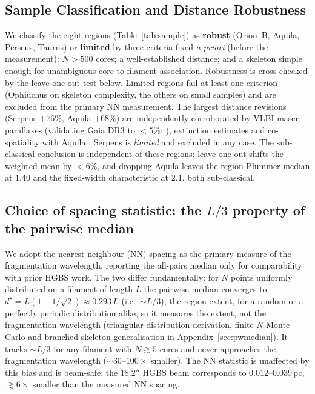 \documentclass[usenatbib,twoside,twocolumn]{mnras}
\begin{document}
\subsection{Sample Classification and Distance Robustness}
\label{sec:distance_uncertainties}

We classify the eight regions (Table~\ref{tab:sample}) as \textbf{robust} (Orion~B, Aquila, Perseus, Taurus) or \textbf{limited} by three criteria fixed \emph{a priori} (before the measurement): $N>500$ cores; a well-established distance; and a skeleton simple enough for unambiguous core-to-filament association. Robustness is cross-checked by the leave-one-out test below. Limited regions fail at least one criterion (Ophiuchus on skeleton complexity, the others on small samples) and are excluded from the primary NN measurement. The largest distance revisions (Serpens $+76\%$, Aquila $+68\%$) are independently corroborated by VLBI maser parallaxes (validating Gaia DR3 to $<5\%$; \citealt{Kounkel2018,Xu2021,OrtizLeon2018,OrtizLeon2017}), extinction estimates \citep{Yan2022,Green2024} and co-spatiality with Aquila \citep{Zucker2020}; Serpens is \emph{limited} and excluded in any case. The sub-classical conclusion is independent of these regions: leave-one-out shifts the weighted mean by $<6\%$, and dropping Aquila leaves the region-Plummer median at $1.40$ and the fixed-width characteristic at $2.1$, both sub-classical.


\subsection{Choice of spacing statistic: the $L/3$ property of the pairwise median}
\label{sec:statistics}

We adopt the nearest-neighbour (NN) spacing as the primary measure of the fragmentation wavelength, reporting the all-pairs median only for comparability with prior HGBS work. The two differ fundamentally: for $N$ points uniformly distributed on a filament of length $L$ the pairwise median converges to $d^\star=L(1-1/\sqrt{2})\approx0.293\,L$ (i.e.\ $\sim L/3$), the region extent, for a random or a perfectly periodic distribution alike, so it measures the extent, not the fragmentation wavelength (triangular-distribution derivation, finite-$N$ Monte-Carlo and branched-skeleton generalisation in Appendix~\ref{sec:pwmedian}). It tracks $\sim L/3$ for any filament with $N\gtrsim5$ cores and never approaches the fragmentation wavelength ($\sim30$--$100\times$ smaller). The NN statistic is unaffected by this bias and is beam-safe: the $18.2''$ HGBS beam corresponds to $0.012$--$0.039$\,pc, $\gtrsim6\times$ smaller than the measured NN spacing.
\end{document}
